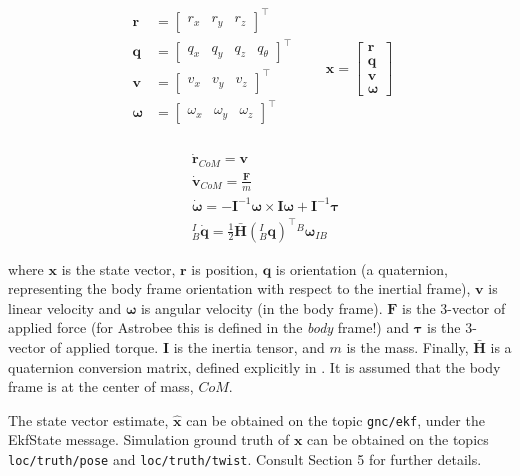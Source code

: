 \documentclass{article}
\begin{document}
\begin{align*}
\begin{split}
\mathbf{r} &= 
\begin{bmatrix}r_x&r_y&r_z\end{bmatrix}^\top\\
\mathbf{q} &=  
\begin{bmatrix}q_x&q_y&q_z&q_\theta\end{bmatrix}^\top\\
\mathbf{v} &=
\begin{bmatrix}v_x&v_y&v_z\end{bmatrix}^\top\\
\bm{\omega} &=
\begin{bmatrix}\omega_x&\omega_y&\omega_z\end{bmatrix}^\top\\
\end{split}
\quad \quad \mathbf{x} = 
\begin{bmatrix}\mathbf{r}\\\mathbf{q}\\\mathbf{v}\\\bm{\omega}
\end{bmatrix}
\end{align*}

\begin{align*}
&\mathbf{\dot{r}}_{CoM} = \mathbf{v}\\
&\mathbf{\dot{v}}_{CoM} = \frac{\mathbf{F}}{m}\\
&\mathbf{\dot{\bm{\omega}}} = -\mathbf{I}^{-1}\bm{\omega}\times\mathbf{I}\bm{\omega} + \mathbf{I}^{-1}\bm{\tau}\\
&^{I}_{B}\mathbf{\dot{q}} = \frac{1}{2} \bar{\mathbf{H}}(^{I}_{B}\mathbf{q})^{\top} {^{B}\bm{\omega}_{IB}}
\end{align*}

\noindent where $\mathbf{x}$ is the state vector, $\mathbf{r}$ is position, $\mathbf{q}$ is orientation (a quaternion, representing the body frame orientation with respect to the inertial frame), $\mathbf{v}$ is linear velocity and $\bm{\omega}$ is angular velocity (in the body frame). $\mathbf{F}$ is the 3-vector of applied force (for Astrobee this is defined in the \textit{body} frame!) and $\bm{\tau}$ is the 3-vector of applied torque. $\mathbf{I}$ is the inertia tensor, and $m$ is the mass. Finally, $\bar{\mathbf{H}}$ is a quaternion conversion matrix, defined explicitly in \cite{Albee2019}. It is assumed that the body frame is at the center of mass, $CoM$.

The state vector estimate, $\mathbf{\hat{x}}$ can be obtained on the topic \texttt{gnc/ekf}, under the EkfState message. Simulation ground truth of $\mathbf{x}$ can be obtained on the topics \texttt{loc/truth/pose} and \texttt{loc/truth/twist}. Consult Section 5 for further details.
\end{document}

